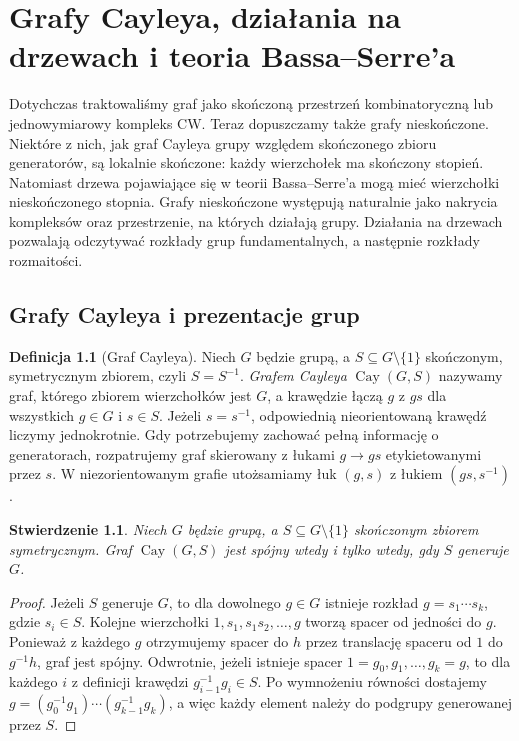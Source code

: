 \documentclass[11pt,a4paper]{report}
\numberwithin{equation}{section}
\theoremstyle{plain}
\newtheorem{stwierdzenie}[twierdzenie]{Stwierdzenie}
\theoremstyle{definition}
\newtheorem{definicja}[twierdzenie]{Definicja}
\theoremstyle{remark}
\begin{document}
\chapter{Grafy Cayleya, działania na drzewach i teoria Bassa--Serre'a}
\label{ch:tg-bass-serre}

Dotychczas traktowaliśmy graf jako skończoną przestrzeń kombinatoryczną lub
jednowymiarowy kompleks CW. Teraz dopuszczamy także grafy nieskończone. Niektóre z nich,
jak graf Cayleya grupy względem skończonego zbioru generatorów,
są lokalnie skończone: każdy wierzchołek ma skończony stopień.
Natomiast drzewa pojawiające się w teorii Bassa--Serre'a mogą
mieć wierzchołki nieskończonego stopnia. Grafy nieskończone
występują naturalnie jako nakrycia kompleksów oraz przestrzenie,
na których działają grupy. Działania na drzewach pozwalają
odczytywać rozkłady grup fundamentalnych, a następnie rozkłady rozmaitości.

\section{Grafy Cayleya i prezentacje grup}
\label{sec:tg-cayley}

\begin{definicja}[Graf Cayleya]
Niech $G$ będzie grupą, a $S\subseteq G\setminus\{1\}$
skończonym, symetrycznym zbiorem, czyli $S=S^{-1}$.
\emph{Grafem Cayleya} $\operatorname{Cay}(G,S)$ nazywamy graf,
którego zbiorem wierzchołków jest $G$, a krawędzie łączą
$g$ z $gs$ dla wszystkich $g\in G$ i $s\in S$.
Jeżeli $s=s^{-1}$, odpowiednią nieorientowaną krawędź liczymy
jednokrotnie. Gdy potrzebujemy zachować pełną informację o generatorach,
rozpatrujemy graf skierowany z łukami $g\to gs$
etykietowanymi przez $s$. W niezorientowanym grafie
utożsamiamy łuk $(g,s)$ z łukiem $(gs,s^{-1})$.
\end{definicja}

\begin{stwierdzenie}
Niech $G$ będzie grupą, a $S\subseteq G\setminus\{1\}$
skończonym zbiorem symetrycznym. Graf $\operatorname{Cay}(G,S)$
jest spójny wtedy i tylko wtedy, gdy $S$ generuje $G$.
\end{stwierdzenie}
\begin{proof}
Jeżeli $S$ generuje $G$, to dla dowolnego $g\in G$ istnieje
rozkład $g=s_1\cdots s_k$, gdzie $s_i\in S$. Kolejne
wierzchołki $1,s_1,s_1s_2,\ldots,g$ tworzą spacer od
jedności do $g$. Ponieważ z każdego $g$ otrzymujemy
spacer do $h$ przez translację spaceru od $1$ do
$g^{-1}h$, graf jest spójny. Odwrotnie, jeżeli istnieje
spacer $1=g_0,g_1,\ldots,g_k=g$, to dla każdego $i$
z definicji krawędzi $g_{i-1}^{-1}g_i\in S$.
Po wymnożeniu równości dostajemy
$g=(g_0^{-1}g_1)\cdots(g_{k-1}^{-1}g_k)$, a więc
każdy element należy do podgrupy generowanej przez $S$.
\end{proof}
\end{document}
